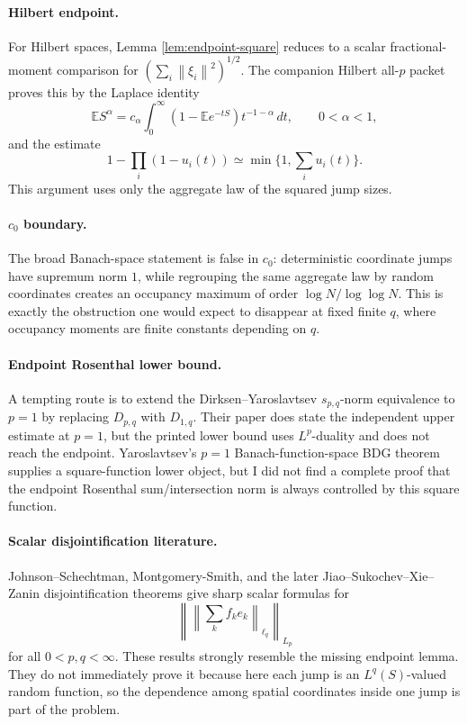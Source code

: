 \documentclass[11pt]{article}
\newcommand{\E}{\mathbb E}
\newcommand{\norm}[1]{\left\lVert #1\right\rVert}
\begin{document}
\paragraph{Hilbert endpoint.}
For Hilbert spaces, Lemma \ref{lem:endpoint-square} reduces to a scalar
fractional-moment comparison for
\((\sum_i \norm{\xi_i}^2)^{1/2}\).  The companion Hilbert all-\(p\) packet
proves this by the Laplace identity
\[
  \E S^\alpha
  =
  c_\alpha\int_0^\infty(1-\E e^{-tS})t^{-1-\alpha}\,dt,
  \qquad 0<\alpha<1,
\]
and the estimate
\[
  1-\prod_i(1-u_i(t))\simeq \min\{1,\sum_i u_i(t)\}.
\]
This argument uses only the aggregate law of the squared jump sizes.

\paragraph{\(c_0\) boundary.}
The broad Banach-space statement is false in \(c_0\): deterministic coordinate
jumps have supremum norm \(1\), while regrouping the same aggregate law by
random coordinates creates an occupancy maximum of order
\(\log N/\log\log N\).  This is exactly the obstruction one would expect to
disappear at fixed finite \(q\), where occupancy moments are finite constants
depending on \(q\).

\paragraph{Endpoint Rosenthal lower bound.}
A tempting route is to extend the Dirksen--Yaroslavtsev \(s_{p,q}\)-norm
equivalence to \(p=1\) by replacing \(D_{p,q}\) with \(D_{1,q}\).  Their paper
does state the independent upper estimate at \(p=1\), but the printed lower
bound uses \(L^p\)-duality and does not reach the endpoint.  Yaroslavtsev's
\(p=1\) Banach-function-space BDG theorem supplies a square-function lower
object, but I did not find a complete proof that the endpoint Rosenthal
sum/intersection norm is always controlled by this square function.

\paragraph{Scalar disjointification literature.}
Johnson--Schechtman, Montgomery-Smith, and the later Jiao--Sukochev--Xie--Zanin
disjointification theorems give sharp scalar formulas for
\[
  \left\|\left\|\sum_k f_k e_k\right\|_{\ell_q}\right\|_{L_p}
\]
for all \(0<p,q<\infty\).  These results strongly resemble the missing
endpoint lemma.  They do not immediately prove it because here each jump is an
\(L^q(S)\)-valued random function, so the dependence among spatial coordinates
inside one jump is part of the problem.
\end{document}
